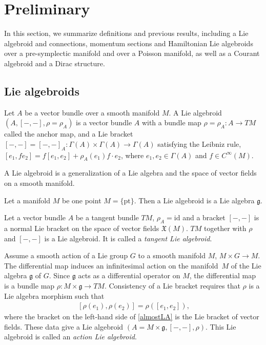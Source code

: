\documentclass[10pt,a4paper]{amsart}
\numberwithin{equation}{section}
\newcommand{\rhoa}{{\rho_A}}
\begin{document}
\section{Preliminary}\label{sec2}

In this section, we summarize definitions and previous results,
including a Lie algebroid and connections, momentum sections and Hamiltonian Lie algebroids over a pre-symplectic manifold and over a Poisson manifold,
as well as a Courant algebroid and a Dirac structure.

\subsection{Lie algebroids}

\begin{Definition}
Let $A$ be a vector bundle over a smooth manifold $M$.
A Lie algebroid $(A, [-,-], \rho=\rhoa)$ is a vector bundle $A$ with
a bundle map $\rho=\rhoa\colon A \rightarrow TM$ called the anchor map,
and a Lie bracket
$[-,-]= [-,-]_A\colon \Gamma(A) \times \Gamma(A) \rightarrow \Gamma(A)$
satisfying the Leibniz rule,
$
[e_1, fe_2] = f [e_1, e_2] + \rhoa(e_1) f \cdot e_2$,
where $e_1, e_2 \in \Gamma(A)$ and $f \in C^{\infty}(M)$.
\end{Definition}
%
A Lie algebroid is a generalization of a Lie algebra and the space of vector fields on a smooth manifold.
\begin{Example}
Let a manifold $M$ be one point $M = \{\mathrm{pt} \}$.
Then a Lie algebroid is a Lie algebra $\mathfrak{g}$.
\end{Example}
\begin{Example}\label{tangentLA}
Let a vector bundle $A$ be a tangent bundle $TM$, $\rhoa = \mathrm{id}$
and a bracket $[-,-]$ is a normal Lie bracket
on the space of vector fields $\mathfrak{X}(M)$.
$TM$ together with $\rho$ and $[-,-]$ is a Lie algebroid.
It is called a \textit{tangent Lie algebroid}.
\end{Example}

\begin{Example}\label{actionLA}
Assume a smooth action of a Lie group $G$ to a smooth manifold $M$,
{$M \times G \rightarrow M$.}
The differential map induces an infinitesimal action on the manifold~$M$ of the Lie algebra $\mathfrak{g}$ of $G$.
Since $\mathfrak{g}$ acts as a differential operator on $M$,
the differential map
is a bundle map $\rho\colon M \times \mathfrak{g} \rightarrow TM$.
Consistency of a Lie bracket requires that $\rho$ is
a Lie algebra morphism such that
\begin{gather}
~[\rho(e_1), \rho(e_2)] = \rho([e_1, e_2]),
\label{almostLA}
\end{gather}
where the bracket on the left-hand side
of \eqref{almostLA} is the Lie bracket of vector fields.
These data give a Lie algebroid $(A= M \times \mathfrak{g}, [-,-], \rho)$.
This Lie algebroid is called an \textit{action Lie algebroid}.
\end{Example}
\end{document}

